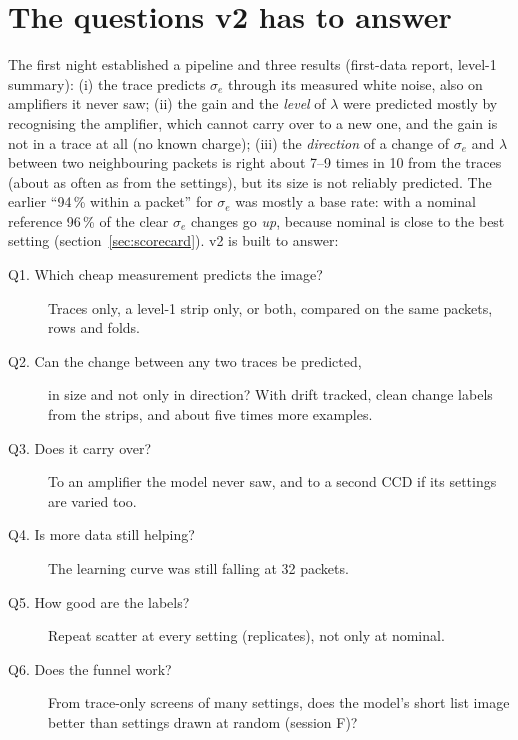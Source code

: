 \documentclass[11pt]{article}
\begin{document}
\tableofcontents

\section{The questions v2 has to answer}

The first night established a pipeline and three results (first-data report, level-1 summary): (i) the trace predicts
$\sigma_e$ through its measured white noise, also on amplifiers it never saw; (ii) the gain and the \emph{level} of
$\lambda$ were predicted mostly by recognising the amplifier, which cannot carry over to a new one, and the gain is not
in a trace at all (no known charge); (iii) the \emph{direction} of a change of $\sigma_e$ and $\lambda$ between two
neighbouring packets is right about 7--9 times in 10 from the traces (about as often as from the settings), but its size
is not reliably predicted. The earlier ``94\,\% within a packet'' for $\sigma_e$ was mostly a base rate: with a nominal
reference 96\,\% of the clear $\sigma_e$ changes go \emph{up}, because nominal is close to the best setting
(section~\ref{sec:scorecard}). v2 is built to answer:

\begin{description}
\item[Q1. Which cheap measurement predicts the image?] Traces only, a level-1 strip only, or both, compared on the same
  packets, rows and folds.
\item[Q2. Can the change between any two traces be predicted,] in size and not only in direction? With drift tracked,
  clean change labels from the strips, and about five times more examples.
\item[Q3. Does it carry over?] To an amplifier the model never saw, and to a second CCD if its settings are varied too.
\item[Q4. Is more data still helping?] The learning curve was still falling at 32 packets.
\item[Q5. How good are the labels?] Repeat scatter at every setting (replicates), not only at nominal.
\item[Q6. Does the funnel work?] From trace-only screens of many settings, does the model's short list image better than
  settings drawn at random (session F)?
\end{description}

\end{document}
